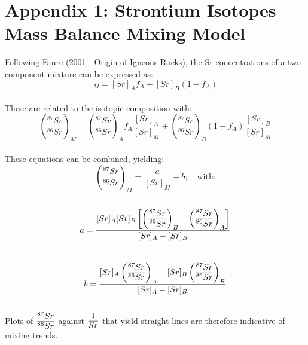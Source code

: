 



\section*{Appendix 1: Strontium Isotopes Mass Balance Mixing Model}

Following Faure (2001 - Origin of Igneous Rocks), the Sr concentrations of a two-component mixture can be expressed as:\\

\begin{equation}
    [Sr]_M = [Sr]_A f_A + [Sr]_B(1-f_A)
\end{equation}\\

These are related to the isotopic composition with:\\

\begin{equation}
    \left(\frac{^{87}Sr}{^{86}Sr}\right)_M = \left(\frac{^{87}Sr}{^{86}Sr}\right)_A f_A \frac{[Sr]_A}{[Sr]_M} + \left(\frac{^{87}Sr}{^{86}Sr}\right)_B(1-f_A)\frac{[Sr]_B}{[Sr]_M} 
\end{equation}\\

These equations can be combined, yielding:\\

\begin{equation}
    \left(\frac{^{87}Sr}{^{86}Sr}\right)_M = \frac{a}{[Sr]_M} + b; \quad \text{with:}
\end{equation}\\
\begin{equation}
    a = \frac{[Sr]_A [Sr]_B \left[ \left( \ddfrac{^{87}Sr}{^{86}Sr} \right)_B - \left( \ddfrac{^{87}Sr}{^{86}Sr} \right)_A \right]}{[Sr]_A - [Sr]_B}
\end{equation}\\
\begin{equation}
    b = \frac{[Sr]_A \left( \ddfrac{^{87}Sr}{^{86}Sr} \right)_A - [Sr]_B \left( \ddfrac{^{87}Sr}{^{86}Sr} \right)_B}{[Sr]_A - [Sr]_B}
\end{equation}\\

Plots of $\ddfrac{^{87}Sr}{^{86}Sr}$ against $\ddfrac{1}{Sr}$ that yield straight lines are therefore indicative of mixing trends. 

\newpage


